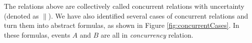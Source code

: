 \documentclass[dvips,...]{llncs}
\begin{document}
The relations above are collectively called concurrent relations with uncertainty (denoted as $\parallel$). We have also identified several cases of concurrent relations and turn them into abstract formulas, as shown in Figure \ref{fig:concurrentCases}. In these formulas, events $A$ and $B$ are all in \textit{concurrency} relation.

\begin{figure}[htbp]
\centering
{}
\end{figure}
\end{document}
